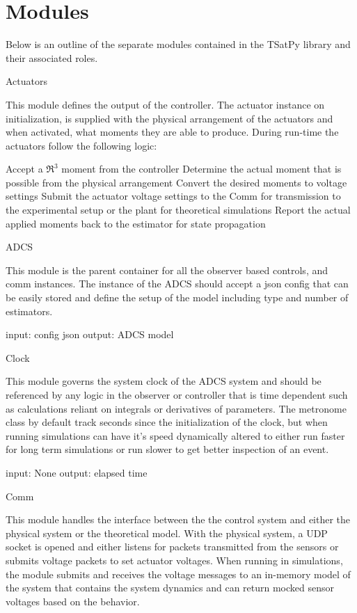 \section{Modules}
\label{sec:Modules}

Below is an outline of the separate modules contained in the TSatPy library and their associated roles.

Actuators

This module defines the output of the controller. The actuator instance on initialization, is supplied with the physical arrangement of the actuators and when activated, what moments they are able to produce. During run-time the actuators follow the following logic:

    Accept a $\Re^3$ moment from the controller
    Determine the actual moment that is possible from the physical arrangement
    Convert the desired moments to voltage settings
    Submit the actuator voltage settings to
        the Comm for transmission to the experimental setup or
        the plant for theoretical simulations
    Report the actual applied moments back to the estimator for state propagation

ADCS

This module is the parent container for all the observer based controls, and comm instances. The instance of the ADCS should accept a json config that can be easily stored and define the setup of the model including type and number of estimators.

    input: config json
    output: ADCS model

Clock

This module governs the system clock of the ADCS system and should be referenced by any logic in the observer or controller that is time dependent such as calculations reliant on integrals or derivatives of parameters. The metronome class by default track seconds since the initialization of the clock, but when running simulations can have it's speed dynamically altered to either run faster for long term simulations or run slower to get better inspection of an event.

    input: None
    output: elapsed time

Comm

This module handles the interface between the the control system and either the physical system or the theoretical model. With the physical system, a UDP socket is opened and either listens for packets transmitted from the sensors or submits voltage packets to set actuator voltages. When running in simulations, the module submits and receives the voltage messages to an in-memory model of the system that contains the system dynamics and can return mocked sensor voltages based on the behavior.

